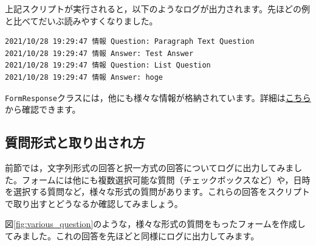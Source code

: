 \documentclass[uplatex,a4j]{jsarticle}
\begin{document}
上記スクリプトが実行されると，以下のようなログが出力されます。先ほどの例と比べてだいぶ読みやすくなりました。

\begin{lstlisting}[basicstyle=\ttfamily\footnotesize,frame=single,caption=Event Object output example 3]
2021/10/28 19:29:47	情報 Question: Paragraph Text Question
2021/10/28 19:29:47	情報 Answer: Test Answer
2021/10/28 19:29:47	情報 Question: List Question
2021/10/28 19:29:47	情報 Answer: hoge
\end{lstlisting}

\verb|FormResponse|クラスには，他にも様々な情報が格納されています。詳細は\href{https://developers.google.com/apps-script/reference/forms/form-response?hl=en}{こちら}から確認できます。

\subsection{質問形式と取り出され方}


前節では，文字列形式の回答と択一方式の回答についてログに出力してみました。フォームには他にも複数選択可能な質問（チェックボックスなど）や，日時を選択する質問など，様々な形式の質問があります。これらの回答をスクリプトで取り出すとどうなるか確認してみましょう。

図\ref{fig:various_question}のような，様々な形式の質問をもったフォームを作成してみました。これの回答を先ほどと同様にログに出力してみます。
\end{document}
